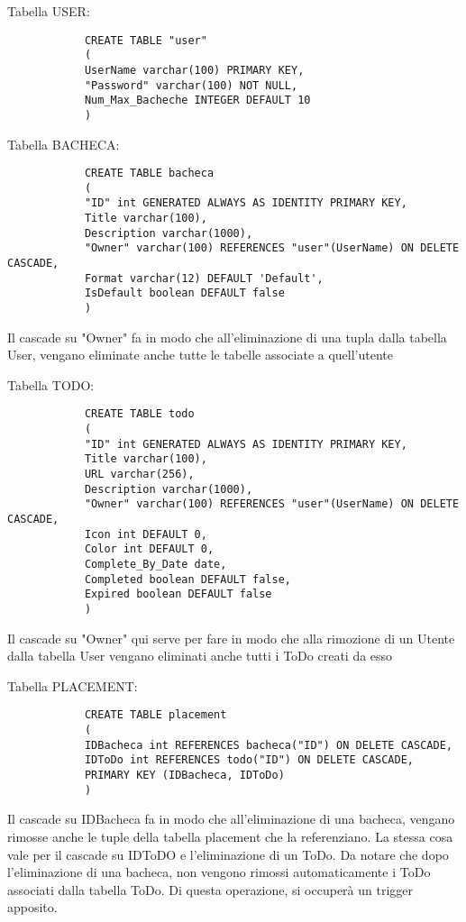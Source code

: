 \documentclass{article}
\begin{document}
		\hfill \linebreak[4]
		 Tabella USER:
		
			\begin{lstlisting}
			CREATE TABLE "user"
			(
			UserName varchar(100) PRIMARY KEY, 
			"Password" varchar(100) NOT NULL,
			Num_Max_Bacheche INTEGER DEFAULT 10
			)		
		\end{lstlisting}
		
		\hfill \linebreak[4]
		
		Tabella BACHECA:
		
			\begin{lstlisting}
			CREATE TABLE bacheca
			(
			"ID" int GENERATED ALWAYS AS IDENTITY PRIMARY KEY,
			Title varchar(100),
			Description varchar(1000),
			"Owner" varchar(100) REFERENCES "user"(UserName) ON DELETE CASCADE,
			Format varchar(12) DEFAULT 'Default',
			IsDefault boolean DEFAULT false
			)
		\end{lstlisting}
		Il cascade su "Owner" fa in modo che all'eliminazione di una tupla dalla tabella User, vengano eliminate anche tutte le tabelle associate a quell'utente
		
		\pagebreak
		
		Tabella TODO:
		
			\begin{lstlisting}
			CREATE TABLE todo
			(
			"ID" int GENERATED ALWAYS AS IDENTITY PRIMARY KEY,
			Title varchar(100),
			URL varchar(256),
			Description varchar(1000),
			"Owner" varchar(100) REFERENCES "user"(UserName) ON DELETE CASCADE,
			Icon int DEFAULT 0,
			Color int DEFAULT 0,
			Complete_By_Date date,
			Completed boolean DEFAULT false,
			Expired boolean DEFAULT false
			)
		\end{lstlisting}
		Il cascade su "Owner" qui serve per fare in modo che alla rimozione di un Utente dalla tabella User vengano eliminati anche tutti i ToDo creati da esso
		\linebreak[6]
		
		Tabella PLACEMENT:
			\begin{lstlisting}
			CREATE TABLE placement
			(
			IDBacheca int REFERENCES bacheca("ID") ON DELETE CASCADE,
			IDToDo int REFERENCES todo("ID") ON DELETE CASCADE,
			PRIMARY KEY (IDBacheca, IDToDo)
			)
		\end{lstlisting}
		Il cascade su IDBacheca fa in modo che all'eliminazione di una bacheca, vengano rimosse anche le tuple della tabella placement che la referenziano.
		La stessa cosa vale per il cascade su IDToDO e l'eliminazione di un ToDo.
		Da notare che dopo l'eliminazione di una bacheca, non vengono rimossi automaticamente i ToDo associati dalla tabella ToDo. Di questa operazione, si occuperà un trigger apposito.
		
\end{document}
